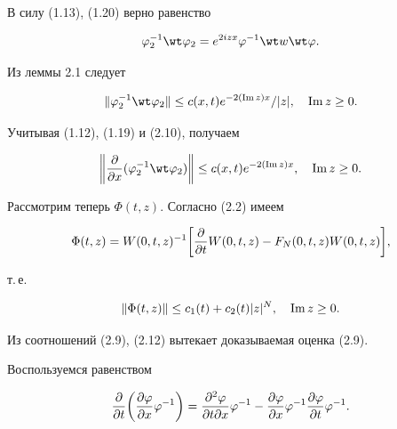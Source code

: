 \begin{pf} В силу (1.13), (1.20) верно равенство 


$$ 


\varphi^{-1}_2\wt\varphi_2=e^{2izx}\varphi^{-1}\wt w\wt\varphi. 


$$ 


Из леммы 2.1 следует 


\begin{equation} 


\|\varphi^{-1}_2\wt\varphi_2\|\le c(x,t) 


e^{-2(\im z)x}/|z|,\quad \im z\ge 0. 


\end{equation} 


Учитывая (1.12), (1.19) и (2.10), получаем 


\begin{equation} 


\bigg\|\myfrac{}{x}(\varphi^{-1}_2\wt\varphi_2)\bigg\|\le 


c(x,t)e^{-2(\im z)x},\quad \im z\ge 0. 


\end{equation} 


Рассмотрим теперь $\Phi(t,z)$. Согласно (2.2) имеем 


$$ 


\Phi(t,z)=W(0,t,z)^{-1}\bigg[\myfrac{}{t} 


W(0,t,z)-F_N(0,t,z)W(0,t,z)\bigg], 


$$ 


т.\,е. 


\begin{equation} 


\|\Phi(t,z)\|\le c_1(t)+c_2(t)|z|^N,\quad \im z\ge 0. 


\end{equation} 


Из соотношений (2.9), (2.12) вытекает доказываемая оценка (2.9). 


 


Воспользуемся равенством 


\begin{equation} 


\myfrac{}{t}\bigg(\myfrac{\varphi}{x}\varphi^{-1}\bigg)= 


\myfrac{^2\varphi}{t\partial x}\varphi^{-1}- 


\myfrac{\varphi}{x}\varphi^{-1}\myfrac{\varphi}{t}\varphi^{-1}. 


\end{equation} 



\end{pf}

